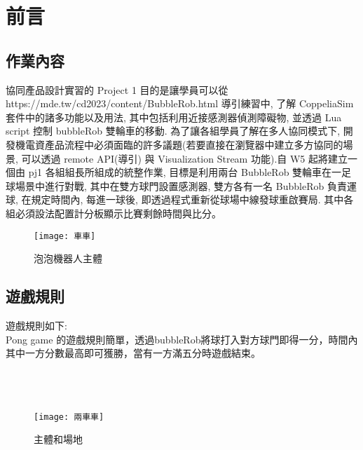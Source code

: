 \chapter{前言}
\renewcommand{\baselinestretch}{10.0} %
\setcounter{page}{1}  %
\fontsize{14pt}{2.5pt}\sectionef
\section{作業內容}
協同產品設計實習的 Project 1 目的是讓學員可以從 \\
https://mde.tw/cd2023/content/BubbleRob.html 導引練習中, 了解 CoppeliaSim 套件中的諸多功能以及用法, 其中包括利用近接感測器偵測障礙物, 並透過 Lua script 控制 bubbleRob 雙輪車的移動. 為了讓各組學員了解在多人協同模式下, 開發機電資產品流程中必須面臨的許多議題(若要直接在瀏覽器中建立多方協同的場景, 可以透過 remote API(導引) 與 Visualization Stream 功能).自 W5 起將建立一個由 pj1 各組組長所組成的統整作業, 目標是利用兩台 BubbleRob 雙輪車在一足球場景中進行對戰, 其中在雙方球門設置感測器, 雙方各有一名 BubbleRob 負責運球, 在規定時間內, 每進一球後, 即透過程式重新從球場中線發球重啟賽局. 其中各組必須設法配置計分板顯示比賽剩餘時間與比分。\\

\begin{figure}[hbt!]
\begin{center}
\texttt{[image: 車車]}
\caption{\Large 泡泡機器人主體 }
\label{泡泡機器人主體}
\end{center}
\end{figure}


\section{遊戲規則}
遊戲規則如下:\\

Pong game 的遊戲規則簡單，透過bubbleRob將球打入對方球門即得一分，時間內其中一方分數最高即可獲勝，當有一方滿五分時遊戲結束。
\\
\\
\\
\\
   
\begin{figure}[hbt!]
\begin{center}
\texttt{[image: 兩車車]}
\caption{\Large 主體和場地 }
\label{主體和場地 }
\end{center}
\end{figure}
\newpage


